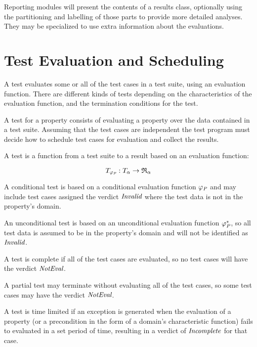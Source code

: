 Reporting modules will present the contents of a results class,
optionally using the partitioning and labelling of those parts
to provide more detailed analyses.
They may be specialized to use extra information about the evaluations.

\section{Test Evaluation and Scheduling}

A test evaluates some or all of the test cases in a test suite,
using an evaluation function.
There are different kinds of tests depending on 
the characteristics of the evaluation function,
and the termination conditions for the test.

A test for a property consists of evaluating a property
over the data contained in a test suite.
Assuming that the test cases are independent 
the test program must decide how to schedule test cases for evaluation
and collect the results.


\begin{df}[Test]
A test is a function from a test suite to a result based on an evaluation function:

$$T_{\varphi_{\emph{P}}} : \emph{\ensuremath{T_{\alpha}}} \rightarrow \mathfrak{R}_{\alpha}$$
\end{df}


\begin{df}
A conditional test is based on a conditional evaluation function $\varphi_{\emph{P}}$ 
and may include test cases assigned the verdict $\emph{Invalid}$ where
the test data is not in the property's domain.
\end{df}
\begin{df}
An unconditional test is based on an unconditional evaluation function $\varphi^*_{\emph{P}}$, 
so all test data is assumed to be in the property's domain
and will not be identified as $\emph{Invalid}$.
\end{df}

\begin{df}
A test is complete if all of the test cases are evaluated,
so no test cases will have the verdict $\emph{NotEval}$.
\end{df}
\begin{df}
A partial test may terminate without evaluating all of the test cases,
so some test cases may have the verdict $\emph{NotEval}$.
\end{df}

\begin{df}
A test is time limited if an exception is generated when
the evaluation of a property (or a precondition in the form of a domain's characteristic function)
fails to evaluated in a set period of time,
resulting in a verdict of $\emph{Incomplete}$ for that case.
\end{df}

